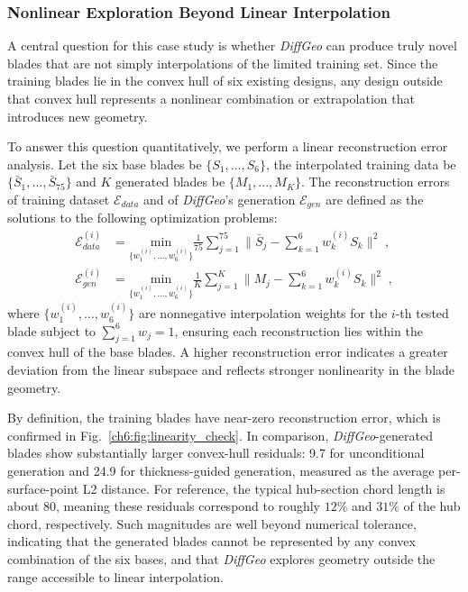 \subsubsection{Nonlinear Exploration Beyond Linear Interpolation}
A central question for this case study is whether \textit{DiffGeo} can produce truly novel blades that are not simply interpolations of the limited training set. Since the training blades lie in the convex hull of six existing designs, any design outside that convex hull represents a nonlinear combination or extrapolation that introduces new geometry. 

To answer this question quantitatively, we perform a linear reconstruction error analysis. Let the six base blades be $\{S_1,...,S_6\}$, the interpolated training data be $\{\bar{S}_1,...,\bar{S}_{75}\}$ and $K$ generated blades be $\{M_1,...,M_K\}$. The reconstruction errors of training dataset $\mathcal{E}_{data}$ and of \textit{DiffGeo}'s generation $\mathcal{E}_{gen}$ are defined as the solutions to the following optimization problems:
\begin{align}
    \mathcal{E}_{data}^{(i)} & =\underset{\{w_1^{(i)},...,w_6^{(i)}\}} {\mathrm{min}} \frac{1}{75}\sum_{j=1}^{75} \bigl\| \bar{S}_j-\sum_{k=1}^6 w_k^{(i)}S_k \bigr\|^2 \;,\\
    \mathcal{E}_{gen}^{(i)} & =\underset{\{w_1^{(i)},...,w_6^{(i)}\}} {\mathrm{min}} \frac{1}{K}\sum_{j=1}^{K} \bigl\| M_j-\sum_{k=1}^6 w_k^{(i)}S_k \bigr\|^2 \;,
\end{align}
where $\{w_1^{(i)}, \dots, w_6^{(i)}\}$ are nonnegative interpolation weights for the $i$-th tested blade subject to $\sum_{j=1}^6 w_j = 1$, ensuring each reconstruction lies within the convex hull of the base blades. A higher reconstruction error indicates a greater deviation from the linear subspace and reflects stronger nonlinearity in the blade geometry.

By definition, the training blades have near-zero reconstruction error, which is confirmed in Fig.~\ref{ch6:fig:linearity_check}.
In comparison, \textit{DiffGeo}-generated blades show substantially larger convex-hull residuals: 9.7 for unconditional generation and 24.9 for thickness-guided generation, measured as the average per-surface-point L2 distance. For reference, the typical hub-section chord length is about 80, meaning these residuals correspond to roughly $12\%$ and $31\%$ of the hub chord, respectively. Such magnitudes are well beyond numerical tolerance, indicating that the generated blades cannot be represented by any convex combination of the six bases, and that \textit{DiffGeo} explores geometry outside the range accessible to linear interpolation.

